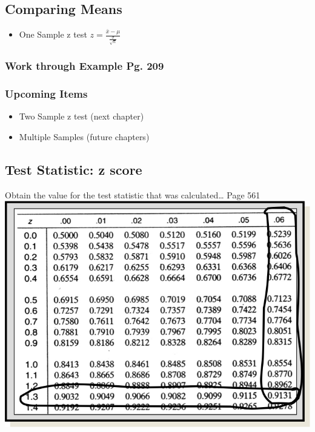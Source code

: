 \documentclass[]{article}
\begin{document}
\subsection{Comparing Means}\label{comparing-means}

\begin{itemize}
\itemsep1pt\parskip0pt
\item
  One Sample z test $z = \frac{\bar{x}-\mu}{\frac{\sigma}{\sqrt{n}}}$
\end{itemize}

\subsubsection{Work through Example Pg.
209}\label{work-through-example-pg.-209}

\subsubsection{Upcoming Items}\label{upcoming-items}

\begin{itemize}
\itemsep1pt\parskip0pt
\item
  Two Sample z test (next chapter)
\item
  Multiple Samples (future chapters)
\end{itemize}

\subsection{Test Statistic: z score}\label{test-statistic-z-score}

Obtain the value for the test statistic that was calculated\ldots{} Page
561 \includegraphics{ztable1.png}
\end{document}
